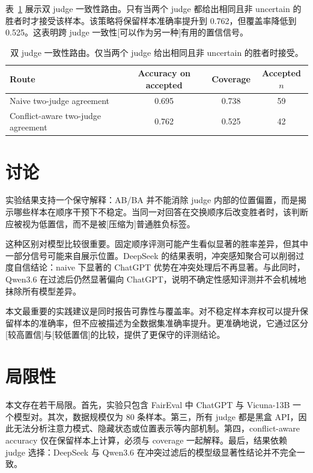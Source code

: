 \documentclass[11pt]{ctexart}
\begin{document}
表~\ref{tab:routing-zh} 展示双 judge 一致性路由。只有当两个 judge 都给出相同且非 uncertain 的胜者时才接受该样本。该策略将保留样本准确率提升到 0.762，但覆盖率降低到 0.525。这表明跨 judge 一致性[可以作为另一种]有用的置信信号。

\begin{table}[h]
\centering
\begin{tabular}{lccc}
\toprule
Route & Accuracy on accepted & Coverage & Accepted $n$ \\
\midrule
Naive two-judge agreement & 0.695 & 0.738 & 59 \\
Conflict-aware two-judge agreement & 0.762 & 0.525 & 42 \\
\bottomrule
\end{tabular}
\caption{双 judge 一致性路由。仅当两个 judge 给出相同且非 uncertain 的胜者时接受。}
\label{tab:routing-zh}
\end{table}

\section{讨论}

实验结果支持一个保守解释：AB/BA 并不能消除 judge 内部的位置偏置，而是揭示哪些样本在顺序干预下不稳定。当同一对回答在交换顺序后改变胜者时，该判断应被视为低置信，而不是被[压缩为]普通胜负标签。

这种区别对模型比较很重要。固定顺序评测可能产生看似显著的胜率差异，但其中一部分信号可能来自展示位置。DeepSeek 的结果表明，冲突感知聚合可以削弱过度自信结论：naive 下显著的 ChatGPT 优势在冲突处理后不再显著。与此同时，Qwen3.6 在过滤后仍然显著偏向 ChatGPT，说明不确定性感知评测并不会机械地抹除所有模型差异。

本文最重要的实践建议是同时报告可靠性与覆盖率。对不稳定样本弃权可以提升保留样本的准确率，但不应被描述为全数据集准确率提升。更准确地说，它通过区分[较高置信]与[较低置信]的比较，提供了更保守的评测结论。

\section{局限性}

本文存在若干局限。首先，实验只包含 FairEval 中 ChatGPT 与 Vicuna-13B 一个模型对。其次，数据规模仅为 80 条样本。第三，所有 judge 都是黑盒 API，因此无法分析注意力模式、隐藏状态或位置表示等内部机制。第四，conflict-aware accuracy 仅在保留样本上计算，必须与 coverage 一起解释。最后，结果依赖 judge 选择：DeepSeek 与 Qwen3.6 在冲突过滤后的模型级显著性结论并不完全一致。
\end{document}
